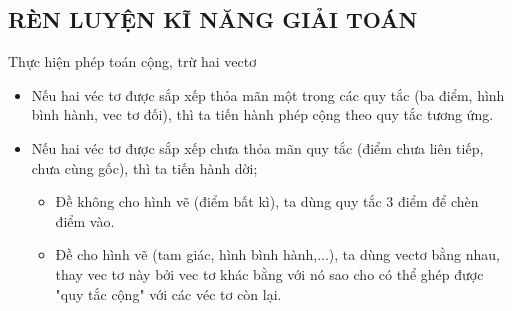\subsection{RÈN LUYỆN KĨ NĂNG GIẢI TOÁN}
\begin{dang}{Thực hiện phép toán cộng, trừ hai vectơ}
	\begin{itemize}
		\item [\iconMT] Nếu hai véc tơ được sắp xếp thỏa mãn một trong các quy tắc (ba điểm, hình bình hành, vec tơ đối), thì ta tiến hành phép cộng theo quy tắc tương ứng.
		\item [\iconMT] Nếu hai véc tơ được sắp xếp chưa thỏa mãn quy tắc (điểm chưa liên tiếp, chưa cùng gốc), thì ta tiến hành dời;
		\begin{itemize}
			\item Đề không cho hình vẽ (điểm bất kì), ta dùng quy tắc 3 điểm để chèn điểm vào.
			\item Đề cho hình vẽ (tam giác, hình bình hành,...), ta dùng vectơ bằng nhau, thay vec tơ này bởi vec tơ khác bằng với nó sao cho có thể ghép được "quy tắc cộng" với các véc tơ còn lại.
		\end{itemize}
	\end{itemize}
\end{dang}
